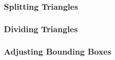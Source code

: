 


\subsubsection{Splitting Triangles}


\subsubsection{Dividing Triangles}





\subsubsection{Adjusting Bounding Boxes}










